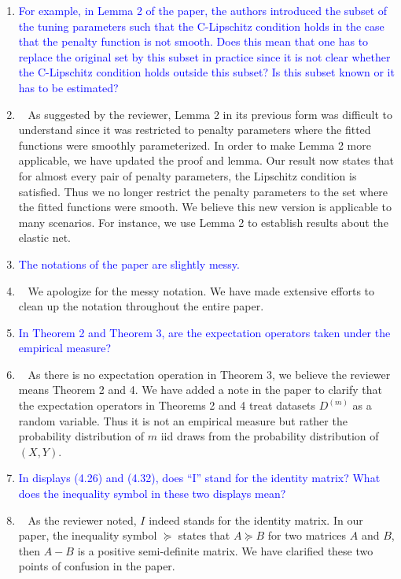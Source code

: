 \documentclass[]{article}
\newcommand{\point}[1]{\item \textcolor{blue}{#1}}
\newcommand{\reply}{\item[]\ }
\begin{document}
\begin{enumerate}
{		}
		
		\point{
			For example, in Lemma 2 of the paper, the authors introduced the subset of the tuning parameters such that the C-Lipschitz condition holds in the case that the penalty function is not smooth.
			Does this mean that one has to replace the original set by this subset in practice since it is not clear whether the C-Lipschitz condition holds outside this subset?
			Is this subset known or it has to be estimated?
		}
		\reply{
		As suggested by the reviewer, Lemma 2 in its previous form was difficult to understand since it was restricted to penalty parameters where the fitted functions were smoothly parameterized.
		In order to make Lemma 2 more applicable, we have updated the proof and lemma.
		Our result now states that for almost every pair of penalty parameters, the Lipschitz condition is satisfied.
		Thus we no longer restrict the penalty parameters to the set where the fitted functions were smooth.
		We believe this new version is applicable to many scenarios.
		For instance, we use Lemma 2 to establish results about the elastic net.
		}
		
		\point{
		The notations of the paper are slightly messy.
		}
	
		\reply{
			We apologize for the messy notation. We have made extensive efforts to clean up the notation throughout the entire paper.
		}
	
		\point{
			In Theorem 2 and Theorem 3, are the expectation operators taken under the empirical measure?
		}
		\reply{
			As there is no expectation operation in Theorem 3, we believe the reviewer means Theorem 2 and 4.
			We have added a note in the paper to clarify that the expectation operators in Theorems 2 and 4 treat datasets $D^{(m)}$ as a random variable.
			Thus it is not an empirical measure but rather the probability distribution of $m$ iid draws from the probability distribution of $(X,Y)$.
		}
		\point{
			In displays (4.26) and (4.32), does “I” stand for the identity matrix? What does the inequality symbol in these two displays mean?
		}
	
		\reply{
			As the reviewer noted, $I$ indeed stands for the identity matrix.
			In our paper, the inequality symbol $\succeq$ states that $A \succeq B$ for two matrices $A$ and $B$, then $A - B$ is a positive semi-definite matrix.
			We have clarified these two points of confusion in the paper.
		}
	\end{enumerate} 
	
\end{document}
